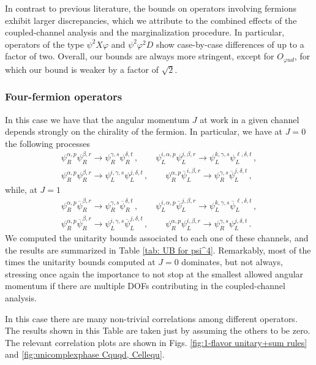 \documentclass[a4paper,11pt]{article}
\begin{document}
In contrast to previous literature, the bounds on operators involving fermions exhibit larger discrepancies, which we attribute to the combined effects of the coupled-channel analysis and the marginalization procedure. In particular, operators of the type $\psi^2 X\varphi$ and $\psi^2\varphi^2 D$ show case-by-case differences of up to a factor of two. Overall, our bounds are always more stringent, except for $O_{\varphi ud}$, for which our bound is weaker by a factor of $\sqrt{2}$. 

\subsubsection{Four-fermion operators}
In this case we have that the angular momentum $J$ at work in a given channel depends strongly on the chirality of the fermion. In particular, we have at $J=0$ the following processes
\begin{gather}
    \psi_R^{\alpha,p}\psi_R^{\beta,r}\to\psi_R^{\gamma,s}\psi_R^{\delta,t}\,,\qquad \psi_L^{i,\alpha,p}\psi_L^{j,\beta,r}\to\psi_L^{k,\gamma,s}\psi_L^{\ell,\delta,t}\,,\\
    \psi_R^{\alpha,p}\psi_R^{\beta,r}\to\psi_L^{i,\gamma,s}\psi_L^{j,\delta,t}\,,\qquad \psi_R^{\alpha,p}\overline\psi_L^{i,\beta,r}\to\psi_R^{\gamma,s}\overline\psi_L^{j,\delta,t}\,,
\end{gather}
while, at $J=1$
\begin{gather}
    \psi_R^{\alpha,p}\overline\psi_R^{\beta,r}\to\psi_R^{\gamma,s}\overline\psi_R^{\delta,t}\,,\qquad \psi_L^{i,\alpha,p}\overline\psi_L^{j,\beta,r}\to\psi_L^{k,\gamma,s}\overline\psi_L^{\ell,\delta,t}\,,\\
    \psi_R^{\alpha,p}\overline\psi_R^{\beta,r}\to\psi_L^{i,\gamma,s}\overline\psi_L^{j,\delta,t}\,,\qquad \psi_R^{\alpha,p}\psi_L^{i,\beta,r}\to\psi_R^{\gamma,s}\psi_L^{j,\delta,t}\,.
\end{gather}
We computed the unitarity bounds associated to each one of these channels, and the results are summarized in Table \ref{tab: UB for psi^4}. Remarkably, most of the times the unitarity bounds computed at $J=0$ dominates, but not always, stressing once again the importance to not stop at the smallest allowed angular momentum if there are multiple DOFs contributing in the coupled-channel analysis.

In this case there are many non-trivial correlations among different operators. The results shown in this Table are taken just by assuming the others to be zero. The relevant correlation plots are shown in Figs. \ref{fig:1-flavor unitary+sum rules} and \ref{fig:unicomplexphase Cquqd, Cellequ}.
\end{document}
